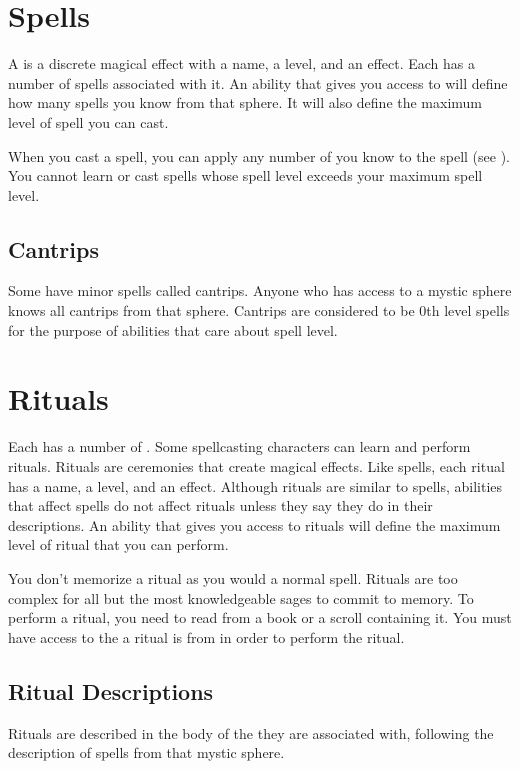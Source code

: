 \section{Spells}\label{Spells}
    A  is a discrete magical effect with a name, a level, and an effect.
    Each  has a number of spells associated with it.
    An ability that gives you access to  will define how many spells you know from that sphere.
    It will also define the maximum level of spell you can cast.

    When you cast a spell, you can apply any number of  you know to the spell (see ).
    You cannot learn or cast spells whose spell level exceeds your maximum spell level.

    \subsection{Cantrips}\label{Cantrips}
        Some  have minor spells called cantrips.
        Anyone who has access to a mystic sphere knows all cantrips from that sphere.
        Cantrips are considered to be 0th level spells for the purpose of abilities that care about spell level.

\section{Rituals}\label{Rituals}
    Each  has a number of .
    Some spellcasting characters can learn and perform rituals.
    Rituals are ceremonies that create magical effects.
    Like spells, each ritual has a name, a level, and an effect.
    Although rituals are similar to spells, abilities that affect spells do not affect rituals unless they say they do in their descriptions.
    An ability that gives you access to rituals will define the maximum level of ritual that you can perform.

    You don't memorize a ritual as you would a normal spell.
    Rituals are too complex for all but the most knowledgeable sages to commit to memory.
    To perform a ritual, you need to read from a book or a scroll containing it.
    You must have access to the  a ritual is from in order to perform the ritual.

    \subsection{Ritual Descriptions}
        Rituals are described in the body of the  they are associated with, following the description of spells from that mystic sphere.

